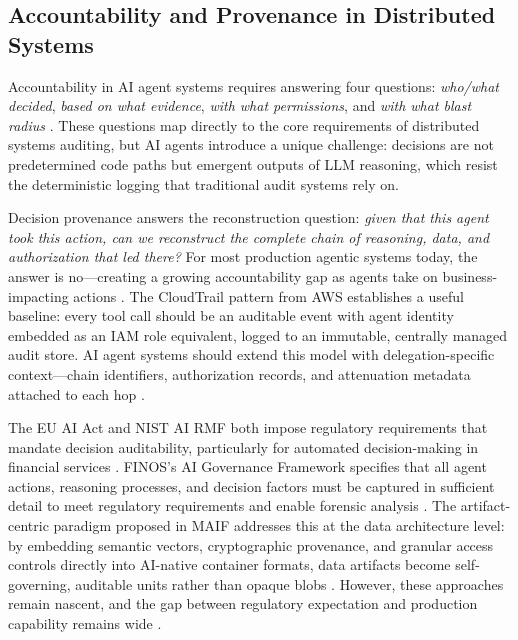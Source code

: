 \subsection{Accountability and Provenance in Distributed Systems}

Accountability in AI agent systems requires answering four questions: \emph{who/what decided}, \emph{based on what evidence}, \emph{with what permissions}, and \emph{with what blast radius} \cite{linkedin_accountability_2026}. These questions map directly to the core requirements of distributed systems auditing, but AI agents introduce a unique challenge: decisions are not predetermined code paths but emergent outputs of LLM reasoning, which resist the deterministic logging that traditional audit systems rely on.

Decision provenance answers the reconstruction question: \emph{given that this agent took this action, can we reconstruct the complete chain of reasoning, data, and authorization that led there?} For most production agentic systems today, the answer is no—creating a growing accountability gap as agents take on business-impacting actions \cite{tianpan_provenance_2026}. The CloudTrail pattern from AWS establishes a useful baseline: every tool call should be an auditable event with agent identity embedded as an IAM role equivalent, logged to an immutable, centrally managed audit store. AI agent systems should extend this model with delegation-specific context—chain identifiers, authorization records, and attenuation metadata attached to each hop \cite{zylos_accountability_2026}.

The EU AI Act and NIST AI RMF both impose regulatory requirements that mandate decision auditability, particularly for automated decision-making in financial services \cite{finos_governance_2026}. FINOS's AI Governance Framework specifies that all agent actions, reasoning processes, and decision factors must be captured in sufficient detail to meet regulatory requirements and enable forensic analysis \cite{finos_governance_2026}. The artifact-centric paradigm proposed in MAIF addresses this at the data architecture level: by embedding semantic vectors, cryptographic provenance, and granular access controls directly into AI-native container formats, data artifacts become self-governing, auditable units rather than opaque blobs \cite{arxiv_maif_2511}. However, these approaches remain nascent, and the gap between regulatory expectation and production capability remains wide \cite{zylos_accountability_2026}.

